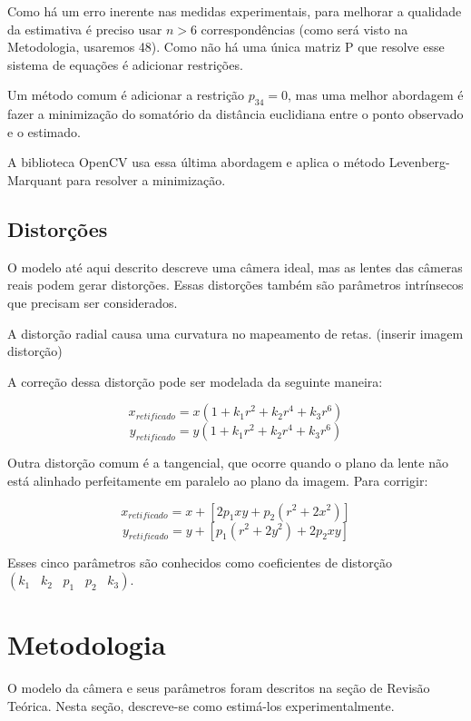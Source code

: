 \documentclass[conference]{IEEEtran}
\begin{document}
Como há um erro inerente nas medidas experimentais, para melhorar a qualidade da estimativa é preciso usar \(n > 6\) correspondências (como será visto na Metodologia, usaremos 48). Como não há uma única matriz P que resolve esse sistema de equações é adicionar restrições.  

Um método comum é adicionar a restrição \(p_34 = 0\)\cite{Hartley2004, tese}, mas uma melhor abordagem\cite{tese} é fazer a minimização do somatório da distância euclidiana entre o ponto observado e o estimado.

A biblioteca OpenCV\cite{OpenCV} usa essa última abordagem e aplica o método Levenberg-Marquant para resolver a minimização. 

\subsection{Distorções}

O modelo até aqui descrito descreve uma câmera ideal, mas as lentes das câmeras reais podem gerar distorções.  Essas distorções também são parâmetros intrínsecos que precisam ser considerados. 

A distorção radial causa uma curvatura no mapeamento de retas\cite{unicamp}.
(inserir imagem distorção)

A correção dessa distorção pode ser modelada da seguinte maneira: 

    \[x_{retificado} = x( 1 + k_1 r^2 + k_2 r^4 + k_3 r^6)\]
    \[y_{retificado} = y( 1 + k_1 r^2 + k_2 r^4 + k_3 r^6)\]

Outra distorção comum é a tangencial, que ocorre quando o plano da lente não está alinhado perfeitamente em paralelo ao plano da imagem. Para corrigir:


\[x_{retificado} = x + [ 2p_1xy + p_2(r^2+2x^2)] \]
\[y_{retificado} = y + [ p_1(r^2+ 2y^2)+ 2p_2xy] \]


Esses cinco parâmetros são conhecidos como coeficientes de distorção
\((k_1 \hspace{10pt} k_2 \hspace{10pt} p_1 \hspace{10pt} p_2 \hspace{10pt} k_3)\).

\section{Metodologia}
O modelo da câmera e seus parâmetros foram descritos na seção de Revisão Teórica. Nesta seção, descreve-se como estimá-los experimentalmente.
\end{document}
